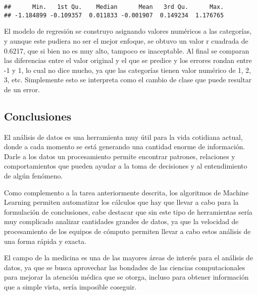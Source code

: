 \documentclass[]{article}
\newenvironment{Shaded}{\begin{snugshade}}{\end{snugshade}}
\newcommand{\KeywordTok}[1]{\textcolor[rgb]{0.13,0.29,0.53}{\textbf{#1}}}
\newcommand{\NormalTok}[1]{#1}
\newcommand{\OperatorTok}[1]{\textcolor[rgb]{0.81,0.36,0.00}{\textbf{#1}}}
\newcommand{\StringTok}[1]{\textcolor[rgb]{0.31,0.60,0.02}{#1}}
\begin{document}
\begin{Shaded}
\end{Shaded}

\begin{verbatim}
##      Min.   1st Qu.    Median      Mean   3rd Qu.      Max. 
## -1.184899 -0.109357  0.011833 -0.001907  0.149234  1.176765
\end{verbatim}

El modelo de regresión se construyo asignando valores numéricos a las
categorías, y aunque este pudiera no ser el mejor enfoque, se obtuvo un
valor r cuadrada de 0.6217, que si bien no es muy alto, tampoco es
inaceptable. Al final se comparan las diferencias entre el valor
original y el que se predice y los errores rondan entre -1 y 1, lo cual
no dice mucho, ya que las categorías tienen valor numérico de 1, 2, 3,
etc. Simplemente esto se interpreta como el cambio de clase que puede
resultar de un error.

\hypertarget{conclusiones}{%
\subsection{Conclusiones}\label{conclusiones}}

El análisis de datos es una herramienta muy útil para la vida cotidiana
actual, donde a cada momento se está generando una cantidad enorme de
información. Darle a los datos un procesamiento permite encontrar
patrones, relaciones y comportamientos que pueden ayudar a la toma de
decisiones y al entendimiento de algún fenómeno.

Como complemento a la tarea anteriormente descrita, los algoritmos de
Machine Learning permiten automatizar los cálculos que hay que llevar a
cabo para la formulación de conclusiones, cabe destacar que sin este
tipo de herramientas sería muy complicado analizar cantidades grandes de
datos, ya que la velocidad de procesamiento de los equipos de cómputo
permiten llevar a cabo estos análisis de una forma rápida y exacta.

El campo de la medicina es una de las mayores áreas de interés para el
análisis de datos, ya que se busca aprovechar las bondades de las
ciencias computacionales para mejorar la atención médica que se otorga,
incluso para obtener información que a simple vista, sería imposible
coseguir.
\end{document}

